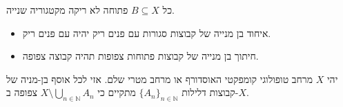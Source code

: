 \documentclass{tstextbook}
\begin{document}
\begin{proposition}
כל \(B\subseteq X\) פתוחה לא ריקה מקטגוריה שנייה.

\end{proposition}
\begin{lemma}
  \begin{itemize}
    \item איחוד בן מנייה של קבוצות סגורות עם פנים ריק יהיה עם פנים ריק.
    \item חיתוך בן מנייה של קבוצות פתוחות צפופות תהיה קבוצה צפופה.
  \end{itemize}
\end{lemma}
\begin{theorem}
יהי \(X\) מרחב טופולוגי קומפקטי האוסדורף או מרחב מטרי שלם.
אזי לכל אוסף בן-מניה של קבוצות דלילות \(\{A_{n}\}_{n\in\mathbb{N}}\) מתקיים כי \(X\setminus\bigcup_{n\in\mathbb{N}}A_{n}\) צפופה ב-\(X\).

\end{theorem}
\end{document}
